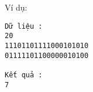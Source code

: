 Ví dụ:  
\begin{verbatim}
Dữ liệu :
20
11101101111000101010
01111101100000010100

Kết quả :
7
\end{verbatim}